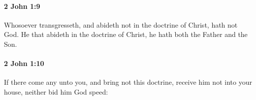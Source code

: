 		\paragraph{2 John 1:9} %
			\label{2JOHN-1-9}

			Whosoever transgresseth, and abideth not in the doctrine of Christ, hath not God.  He that abideth in the doctrine of Christ, he hath both the Father and the Son.

			\begin{framed}
			\scriptsize
				\begin{compactdesc}
					\item[SBLG] 
				\end{compactdesc}
			\end{framed}

		\paragraph{2 John 1:10} %
			\label{2JOHN-1-10}

			If there come any unto you, and bring not this doctrine, receive him not into your house, neither bid him God speed:

